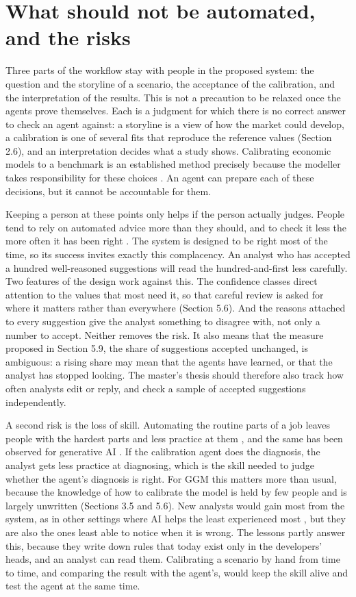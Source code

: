 \section{What should not be automated, and the risks}

Three parts of the workflow stay with people in the proposed system: the question and the storyline of a scenario, the acceptance of the calibration, and the interpretation of the results.
This is not a precaution to be relaxed once the agents prove themselves.
Each is a judgment for which there is no correct answer to check an agent against: a storyline is a view of how the market could develop, a calibration is one of several fits that reproduce the reference values (Section 2.6), and an interpretation decides what a study shows.
Calibrating economic models to a benchmark is an established method precisely because the modeller takes responsibility for these choices \citep{kydland1996computational}.
An agent can prepare each of these decisions, but it cannot be accountable for them.

Keeping a person at these points only helps if the person actually judges.
People tend to rely on automated advice more than they should, and to check it less the more often it has been right \citep{parasuraman2010complacency}.
The system is designed to be right most of the time, so its success invites exactly this complacency.
An analyst who has accepted a hundred well-reasoned suggestions will read the hundred-and-first less carefully.
Two features of the design work against this.
The confidence classes direct attention to the values that most need it, so that careful review is asked for where it matters rather than everywhere (Section 5.6).
And the reasons attached to every suggestion give the analyst something to disagree with, not only a number to accept.
Neither removes the risk.
It also means that the measure proposed in Section 5.9, the share of suggestions accepted unchanged, is ambiguous: a rising share may mean that the agents have learned, or that the analyst has stopped looking.
The master's thesis should therefore also track how often analysts edit or reply, and check a sample of accepted suggestions independently.

A second risk is the loss of skill.
Automating the routine parts of a job leaves people with the hardest parts and less practice at them \citep{bainbridge1983ironies}, and the same has been observed for generative AI \citep{simkute2024ironies}.
If the calibration agent does the diagnosis, the analyst gets less practice at diagnosing, which is the skill needed to judge whether the agent's diagnosis is right.
For GGM this matters more than usual, because the knowledge of how to calibrate the model is held by few people and is largely unwritten (Sections 3.5 and 5.6).
New analysts would gain most from the system, as in other settings where AI helps the least experienced most \citep{brynjolfsson2025generative}, but they are also the ones least able to notice when it is wrong.
The lessons partly answer this, because they write down rules that today exist only in the developers' heads, and an analyst can read them.
Calibrating a scenario by hand from time to time, and comparing the result with the agent's, would keep the skill alive and test the agent at the same time.

